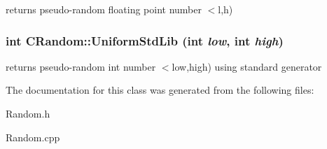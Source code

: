 \label{classCRandom_a9f7a991be94c453958411fb96bea1320}
returns pseudo-\/random floating point number $<$l,h) \hypertarget{classCRandom_a1dd4e0c3ac3dbe68549b8ce1f1c94f45}{
\subsubsection[{UniformStdLib}]{\setlength{\rightskip}{0pt plus 5cm}int CRandom::UniformStdLib (int {\em low}, \/  int {\em high})}}
\label{classCRandom_a1dd4e0c3ac3dbe68549b8ce1f1c94f45}
returns pseudo-\/random int number $<$low,high) using standard generator 

The documentation for this class was generated from the following files:\begin{DoxyCompactItemize}
\item 
Random.h\item 
Random.cpp\end{DoxyCompactItemize}
